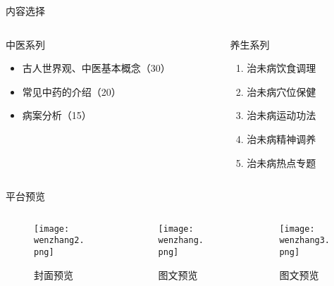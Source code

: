 \begin{frame}{内容选择}
\begin{columns}
    \begin{column}{0.5\textwidth}
    \begin{block}{中医系列}
        \begin{itemize}
            \item 古人世界观、中医基本概念（30）
            \item 常见中药的介绍（20）
            \item 病案分析（15）
        \end{itemize}
    \end{block}
\end{column}
\begin{column}{0.5\textwidth}
    \begin{block}{养生系列}
        \begin{enumerate}
            \item 治未病饮食调理
            \item 治未病穴位保健
            \item 治未病运动功法
            \item 治未病精神调养
            \item 治未病热点专题
        \end{enumerate}
    \end{block}
\end{column}
\end{columns}
\end{frame}

\begin{frame}{平台预览}
    \begin{columns}
    \begin{column}{0.4\textwidth}
        \begin{figure}[h]
            \texttt{[image: wenzhang2.png]}
            \caption{封面预览}
        \end{figure}
    \end{column}
    \begin{column}{0.4\textwidth}
        \begin{figure}[h]
            \texttt{[image: wenzhang.png]}
            \caption{图文预览}
        \end{figure} 
    \end{column}
\begin{column}{0.4\textwidth}
           \begin{figure}[h]
       \texttt{[image: wenzhang3.png]}
       \caption{图文预览}
   \end{figure} 
\end{column}
\end{columns}
\end{frame}